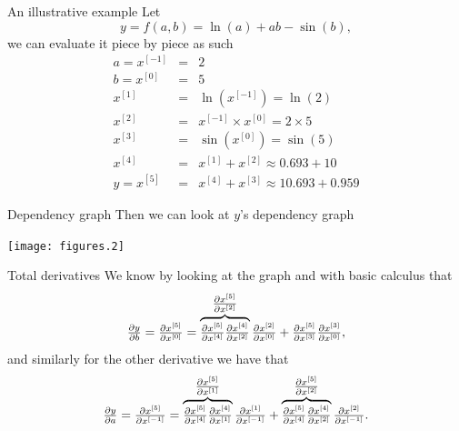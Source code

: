 \documentclass[noamsthm]{beamer}
\begin{document}
\begin{frame}{An illustrative example}
Let \[y = f(a,b) = \ln(a) + a b - \sin(b),\] we can evaluate it piece by piece
as such
\begin{eqnarray*}
a = x^{[-1]} &=& 2 \\
b = x^{[0]}  &=& 5 \\
    x^{[1]}  &=& \ln\left(x^{[-1]}\right) = \ln(2) \\
    x^{[2]}  &=& x^{[-1]} \times x^{[0]} = 2 \times 5 \\
    x^{[3]}  &=& \sin\left(x^{[0]}\right) = \sin(5) \\
    x^{[4]}  &=& x^{[1]} + x^{[2]} \approx 0.693 + 10 \\
y = x^{[5]}  &=& x^{[4]} + x^{[3]} \approx 10.693 + 0.959
\end{eqnarray*}    
\end{frame}

\begin{frame}{Dependency graph}
Then we can look at \(y\)'s dependency graph
\begin{center}
\texttt{[image: figures.2]}
\end{center}
\end{frame}

\begin{frame}{Total derivatives}
We know by looking at the graph and with basic calculus that \[
    \textstyle\frac{\partial y}{\partial b} = \textstyle\frac{\partial x^{[5]}}{\partial x^{[0]}}
    = \overbrace{
        \textstyle\frac{\partial x^{[5]}}{\partial x^{[4]}} \textstyle\frac{\partial x^{[4]}}{\partial x^{[2]}}
    }^{\textstyle\frac{\partial x^{[5]}}{\partial x^{[2]}}} \textstyle\frac{\partial x^{[2]}}{\partial x^{[0]}}
    + \textstyle\frac{\partial x^{[5]}}{\partial x^{[3]}} \textstyle\frac{\partial x^{[3]}}{\partial x^{[0]}},
\] and similarly for the other derivative we have that \[
    \textstyle\frac{\partial y}{\partial a} = \textstyle\frac{\partial x^{[5]}}{\partial x^{[-1]}}
    = \overbrace{
        \textstyle\frac{\partial x^{[5]}}{\partial x^{[4]}} \textstyle\frac{\partial x^{[4]}}{\partial x^{[1]}}
    }^{\textstyle\frac{\partial x^{[5]}}{\partial x^{[1]}}} \textstyle\frac{\partial x^{[1]}}{\partial x^{[-1]}}
    + \overbrace{\textstyle\frac{\partial x^{[5]}}{\partial x^{[4]}} \textstyle\frac{\partial x^{[4]}}{\partial x^{[2]}}
    }^{\textstyle\frac{\partial x^{[5]}}{\partial x^{[2]}}} \textstyle\frac{\partial x^{[2]}}{\partial x^{[-1]}}.
\]
\end{frame}
\end{document}
